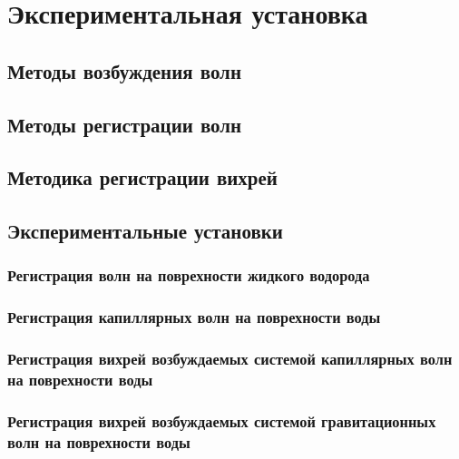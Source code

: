\chapter{Экспериментальная установка} \label{chapt2}

\section{Методы возбуждения волн} \label{sect2_1}


\section{Методы регистрации волн} \label{sect2_2}


\section{Методика регистрации вихрей} \label{sect2_3}


\section{Экспериментальные установки} \label{sect2_4}
\subsection{Регистрация волн на поврехности жидкого водорода}
\subsection{Регистрация капиллярных волн на поврехности воды}
\subsection{Регистрация вихрей возбуждаемых системой капиллярных волн на поврехности воды}
\subsection{Регистрация вихрей возбуждаемых системой гравитационных волн на поврехности воды}
